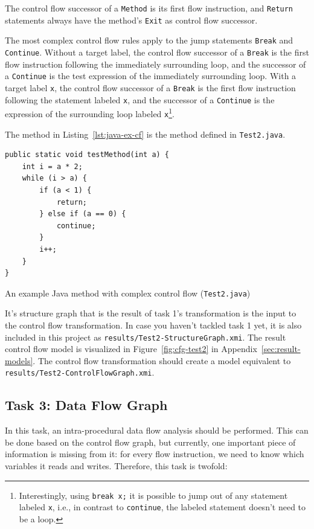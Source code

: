\documentclass[11pt]{article}
\begin{document}
The control flow successor of a \verb|Method| is its first flow instruction,
and \verb|Return| statements always have the method's \verb|Exit| as control
flow successor.

The most complex control flow rules apply to the jump statements \verb|Break|
and \verb|Continue|.  Without a target label, the control flow successor of a
\verb|Break| is the first flow instruction following the immediately
surrounding loop, and the successor of a \verb|Continue| is the test expression
of the immediately surrounding loop.  With a target label \verb|x|, the control
flow successor of a \verb|Break| is the first flow instruction following the
statement labeled \verb|x|, and the successor of a \verb|Continue| is the
expression of the surrounding loop labeled \verb|x|\footnote{Interestingly,
  using \texttt{break x;} it is possible to jump out of any statement labeled
  \texttt{x}, i.e., in contrast to \texttt{continue}, the labeled statement
  doesn't need to be a loop.}.


The method in Listing~\ref{lst:java-ex-cf} is the method defined in
\verb|Test2.java|.

\begin{listing}
  \begin{verbatim}
public static void testMethod(int a) {
    int i = a * 2;
    while (i > a) {
        if (a < 1) {
            return;
        } else if (a == 0) {
            continue;
        }
        i++;
    }
}
  \end{verbatim}
  \caption{An example Java method with complex control flow
    (\texttt{Test2.java})}
  \label{lst:java-ex-cf}
\end{listing}

It's structure graph that is the result of task 1's transformation is the input
to the control flow transformation.  In case you haven't tackled task 1 yet, it
is also included in this project as \verb|results/Test2-StructureGraph.xmi|.
The result control flow model is visualized in Figure~\ref{fig:cfg-test2} in
Appendix~\ref{sec:result-models}.  The control flow transformation should
create a model equivalent to \verb|results/Test2-ControlFlowGraph.xmi|.


\subsection{Task 3: Data Flow Graph}
\label{sec:task3-df-graph}

In this task, an intra-procedural data flow analysis should be performed.  This
can be done based on the control flow graph, but currently, one important piece
of information is missing from it: for every flow instruction, we need to know
which variables it reads and writes.  Therefore, this task is twofold:
\end{document}

